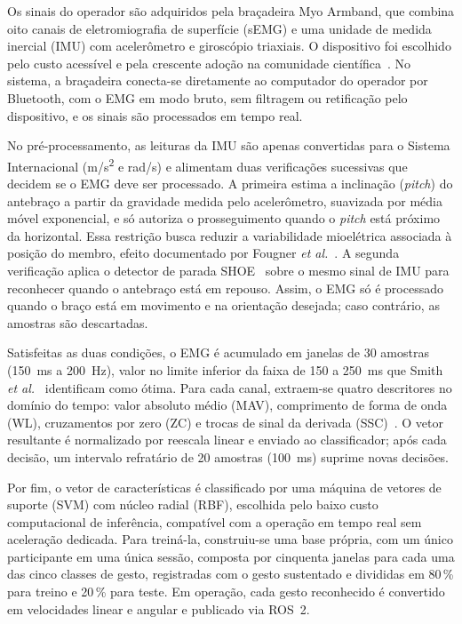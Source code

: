 \documentclass[12pt,a4paper]{article}
\begin{document}
Os sinais do operador são adquiridos pela braçadeira Myo Armband, que
combina oito canais de eletromiografia de superfície (sEMG) e uma
unidade de medida inercial (IMU) com acelerômetro e giroscópio
triaxiais. O dispositivo foi escolhido pelo custo acessível e pela
crescente adoção na comunidade
científica~\cite{mendez2017evaluation}. No sistema, a braçadeira
conecta-se diretamente ao computador do operador por Bluetooth, com o EMG em modo
bruto, sem filtragem ou retificação pelo dispositivo, e os sinais são
processados em tempo real.

No pré-processamento, as leituras da IMU são apenas convertidas para o
Sistema Internacional (m/s\textsuperscript{2} e rad/s) e alimentam
duas verificações sucessivas que decidem se o EMG deve ser processado.
A primeira estima a inclinação (\textit{pitch}) do antebraço a partir
da gravidade medida pelo acelerômetro, suavizada por média móvel
exponencial, e só autoriza o prosseguimento quando
o \textit{pitch} está próximo da horizontal. Essa
restrição busca reduzir a variabilidade mioelétrica associada à posição
do membro, efeito documentado por Fougner \textit{et
al.}~\cite{fougner2011limb}. A segunda verificação aplica o detector de parada
SHOE~\cite{skog2010zero} sobre o mesmo sinal de IMU para reconhecer quando o
antebraço está em repouso. Assim, o EMG só é processado quando o braço está 
em movimento e na orientação desejada; caso contrário, as amostras são descartadas.

Satisfeitas as duas condições, o EMG é acumulado em janelas de 30
amostras (150~ms a 200~Hz), valor no limite inferior da faixa de 150 a
250~ms que Smith \textit{et al.}~\cite{smith2011window} identificam
como ótima. Para cada canal, extraem-se quatro descritores no domínio
do tempo: valor absoluto médio (MAV), comprimento de forma de onda
(WL), cruzamentos por zero (ZC) e trocas de sinal da derivada
(SSC)~\cite{hudgins1993new}. O vetor resultante é normalizado por
reescala linear e enviado ao classificador; após cada decisão, um
intervalo refratário de 20 amostras (100~ms) suprime novas decisões.

Por fim, o vetor de características é classificado por uma máquina de
vetores de suporte (SVM) com núcleo radial (RBF),
escolhida pelo baixo custo computacional de inferência, compatível com a
operação em tempo real sem aceleração dedicada. Para treiná-la,
construiu-se uma base própria, com um único participante em uma única
sessão, composta por cinquenta janelas para cada uma das cinco classes de
gesto, registradas com o gesto sustentado e divididas em 80\,\% para
treino e 20\,\% para teste. Em operação, cada gesto reconhecido é
convertido em velocidades linear e angular e publicado via ROS~2.
\end{document}
